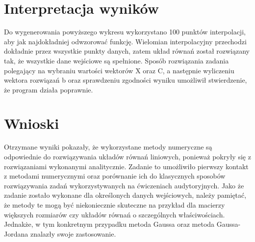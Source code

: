 \documentclass{article}
\begin{document}
\section{Interpretacja wyników}
Do wygenerowania powyższego wykresu wykorzystano 100 punktów interpolacji, aby jak najdokładniej odwzorować funkcję. Wielomian interpolacyjny przechodzi dokładnie przez wszystkie punkty danych, zatem układ równań został rozwiązany tak, że wszystkie dane wejściowe są spełnione.
Sposób rozwiązania zadania polegający na wybraniu wartości wektorów X oraz C, a następnie wyliczeniu wektora rozwiązań b oraz sprawdzeniu zgodności wyniku umożliwił stwierdzenie, że program działa poprawnie. 
\section{Wnioski}
Otrzymane wyniki pokazały, że wykorzystane metody numeryczne są odpowiednie do rozwiązywania układów równań liniowych, ponieważ pokryły się z rozwiązaniami wykonanymi analitycznie. Zadanie to umożliwiło pierwszy kontakt z metodami numerycznymi oraz porównanie ich do klasycznych sposobów rozwiązywania zadań wykorzystywanych na ćwiczeniach audytoryjnych. Jako że zadanie zostało wykonane dla określonych danych wejściowych, należy pamiętać, że metody te mogą być niekoniecznie skuteczne na przykład dla macierzy większych rozmiarów czy układów równań o szczególnych właściwościach. Jednakże, w tym konkretnym przypadku metoda Gaussa oraz metoda Gaussa-Jordana znalazły swoje zastosowanie.
\end{document}
